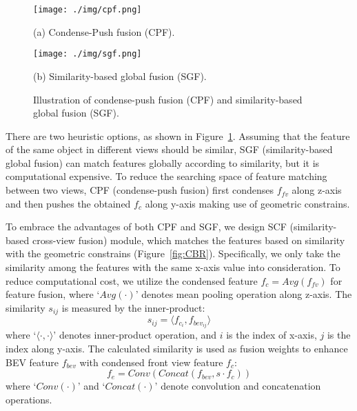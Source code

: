 \documentclass[letterpaper, 10 pt, conference]{ieeeconf}
\begin{document}
\begin{figure}
\footnotesize
\begin{minipage}[b]{1.0\linewidth}
  \centering
  \centerline{\texttt{[image: ./img/cpf.png]}}
  \centerline{(a) Condense-Push fusion (CPF).}\medskip
\end{minipage}
 \vspace{1pt}
\begin{minipage}[b]{1.0\linewidth}
  \centering
  \centerline{\texttt{[image: ./img/sgf.png]}}
  \centerline{(b) Similarity-based global fusion (SGF).}\medskip
\end{minipage}

\caption{Illustration of condense-push fusion (CPF) and similarity-based global fusion (SGF).}
\label{fig:fusion}
\end{figure}

There are two heuristic options, as shown in Figure~\ref{fig:fusion}. Assuming that the feature of the same object in different views should be similar, SGF (similarity-based global fusion) can match features globally according to similarity, but it is computational expensive. To reduce the searching space of feature matching between two views, CPF (condense-push fusion) first condenses $f_{fv}$ along z-axis and then pushes the obtained $f_c$ along 
y-axis making use of geometric constrains. 

To embrace the advantages of both CPF and SGF, we design SCF (similarity-based cross-view fusion) module, which matches the features based on similarity with the geometric constrains (Figure~\ref{fig:CBR}). Specifically, we only take the similarity among the features with the same x-axis value into consideration. To reduce computational cost, we utilize the condensed feature $f_c= \mathit{Avg}(f_{fv})$ for feature fusion, where `$\mathit{Avg}(\cdot)$' denotes mean pooling operation along z-axis. The similarity $s_{ij}$ is measured by the inner-product:
\begin{equation}
  s_{ij} = \langle f_{c_i}, f_{bev_{ij}}  \rangle
\end{equation}
where `$\langle \cdot, \cdot \rangle$' denotes inner-product operation, and $i$ is the index of x-axis, $j$ is the index along 
y-axis. The calculated similarity is used as fusion weights to enhance BEV feature $f_{bev}$ with condensed front view feature $f_c$:
\begin{equation}
  f_e = \mathit{Conv}(\mathit{Concat}(f_{bev}, s \cdot f_c))
\end{equation}
where `$\mathit{Conv}(\cdot)$' and `$\mathit{Concat}(\cdot)$' denote convolution and concatenation operations.
\end{document}
